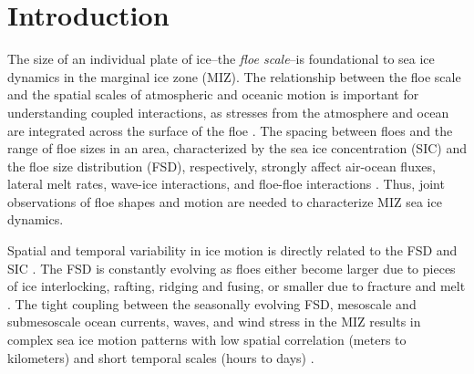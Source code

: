 \documentclass[review, jog]{igs}
\begin{document}
\section{Introduction}
The size of an individual plate of ice--the \emph{floe scale}--is foundational to sea ice dynamics in the marginal ice zone (MIZ).
The relationship between the floe scale and the spatial scales of atmospheric and oceanic motion is important for understanding coupled interactions, as stresses from the atmosphere and ocean are integrated across the surface of the floe \citep{brenner2023_ScaleDependentAirSea,
gupta2024_EddyInducedDispersion,
kim2025_CharacterisationSea}. The spacing between floes and the range of floe sizes in an area, characterized by the sea ice concentration (SIC) and the floe size distribution (FSD), respectively, strongly affect air-ocean fluxes, lateral melt rates, wave-ice interactions, and floe-floe interactions \citep{Mcnutt2003, loose2014_ParameterModel, roach2018_EmergentSea,
wenta2018_InfluenceSpatial, horvat2022_FloesMarginal, herman2022_GranularEffects, manucharyan2022_SpinningIce, brenner2024_ScalingSimulations}.
Thus, joint observations of floe shapes and motion are needed to characterize MIZ sea ice dynamics.

Spatial and temporal variability in ice motion is directly related to the FSD and SIC \citep{overland1995_HierarchySea, dumont2022_MarginalIce,
herman2022_GranularEffects}.
The FSD is constantly evolving as floes either become larger due to pieces of ice interlocking, rafting, ridging and fusing, or smaller  due to fracture and melt \citep{zhang2015_SeaIce, horvat2016_InteractionSea, bateson2020_ImpactSea, roach2024_PhysicsSeasonal}.
The tight coupling between the seasonally evolving FSD, mesoscale and submesoscale ocean currents, waves, and wind stress in the MIZ results in complex sea ice motion patterns with low spatial correlation (meters to kilometers) and short temporal scales (hours to days) \citep{thorndikeSeaIceMotion1982, hakkinen1987_FeedbackIce, johannessen1987_MesoscaleEddies,
johannessen1987_IceEdgeEddies, feltham2005_GranularFlow,  cole2017_IceOcean, watkins2023_EvidenceAbrupt}.
\end{document}
